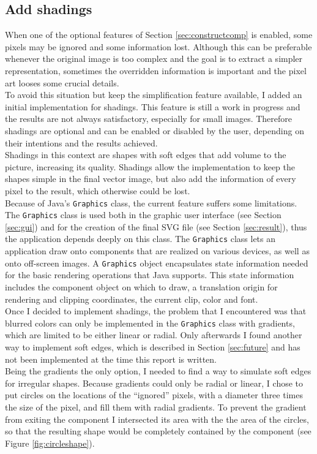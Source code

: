 \documentclass[]{usiinfbachelorproject}
\begin{document}

\subsection{Add shadings} \label{sec:shadings}

When one of the optional features of Section \ref{sec:constructcomp} is enabled, some pixels may be ignored and some information lost. Although this can be preferable whenever the original image is too complex and the goal is to extract a simpler representation, sometimes the overridden information is important and the pixel art looses some crucial details.\\
To avoid this situation but keep the simplification feature available, I added an initial implementation for shadings. This feature is still a work in progress and the results are not always satisfactory, especially for small images. Therefore shadings are optional and can be enabled or disabled by the user, depending on their intentions and the results achieved.\\
Shadings in this context are shapes with soft edges that add volume to the picture, increasing its quality. Shadings allow the implementation to keep the shapes simple in the final vector image, but also add the information of every pixel to the result, which otherwise could be lost.\\

\noindent Because of Java's {\tt Graphics} class, the current feature suffers some limitations. The {\tt Graphics} class is used both in the graphic user interface (see Section \ref{sec:gui}) and for the creation of the final SVG file (see Section \ref{sec:result}), thus the application depends deeply on this class. The {\tt Graphics} class lets an application draw onto components that are realized on various devices, as well as onto off-screen images. A {\tt Graphics} object encapsulates state information needed for the basic rendering operations that Java supports. This state information includes the component object on which to draw, a translation origin for rendering and clipping coordinates, the current clip, color and font.\\
Once I decided to implement shadings, the problem that I encountered was that blurred colors can only be implemented in the {\tt Graphics} class with gradients, which are limited to be either linear or radial. Only afterwards I found another way to implement soft edges, which is described in Section \ref{sec:future} and has not been implemented at the time this report is written.\\
Being the gradients the only option, I needed to find a way to simulate soft edges for irregular shapes. Because gradients could only be radial or linear, I chose to put circles on the locations of the ``ignored'' pixels, with a diameter three times the size of the pixel, and fill them with radial gradients. To prevent the gradient from exiting the component I intersected its area with the the area of the circles, so that the resulting shape would be completely contained by the component (see Figure \ref{fig:circleshape}).
\end{document}
